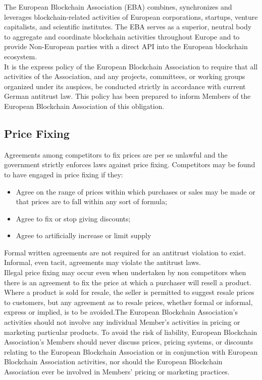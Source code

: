 \documentclass{article}
\begin{document}
The European Blockchain Association (EBA) combines, synchronizes and leverages blockchain-related activities of European corporations, startups, venture capitalists, and scientific institutes. 
The EBA serves as a superior, neutral body to aggregate and coordinate blockchain activities throughout Europe and to provide Non-European parties with a direct API into the European blockchain ecosystem. \\
It is the express policy of the European Blockchain Association to require that all activities of the Association, and any projects, committees, or working groups organized under its auspices, be conducted strictly in accordance with current German antitrust law. This policy has been prepared to inform Members of the European Blockchain Association of this obligation.

\subsection{Price Fixing}

Agreements among competitors to fix prices are per se unlawful and the government strictly enforces laws against price fixing. Competitors may be found to have engaged in price fixing if they: 

\begin{itemize}
	\item Agree on the range of prices within which purchases or sales may be made or that prices are to fall within any sort of formula;
	\item Agree to fix or stop giving discounts; 
	\item Agree to artificially increase or limit supply
\end{itemize}

Formal written agreements are not required for an antitrust violation to exist. Informal, even tacit, agreements may violate the antitrust laws. \\
Illegal price fixing may occur even when undertaken by non competitors when there is an agreement to fix the price at which a purchaser will resell a product. 
Where a product is sold for resale, the seller is permitted to suggest resale prices to customers, but any agreement as to resale prices, whether formal or informal, express or implied, is to be avoided.The European Blockchain Association’s activities should not involve any individual Member’s activities in pricing or marketing particular products. 
To avoid the risk of liability, European Blockchain Association’s Members should never discuss prices, pricing systems, or discounts relating to the European Blockchain Association or in conjunction with European Blockchain Association activities, nor should the European Blockchain Association ever be involved in Members’ pricing or marketing practices.
\end{document}
